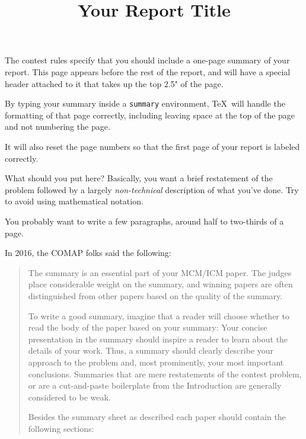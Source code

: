 \documentclass{icmmcm}
\title{Your Report Title}
\begin{document}
\newcommand{\tabincell}[2]{\begin{tabular}{@{}#1@{}}#2\end{tabular}}

\begin{summary}
  The contest rules specify that you should include a one-page summary
  of your report.  This page appears before the rest of the report,
  and will have a special header attached to it that takes up the top
  2.5" of the page.

  By typing your summary inside a \texttt{summary} environment, \TeX\ will
  handle the formatting of that page correctly, including leaving
  space at the top of the page and not numbering the page.
  
  It will also reset the page numbers so that the first page of your
  report is labeled correctly.
  
  What should you put here?  Basically, you want a brief restatement
  of the problem followed by a largely \emph{non-technical}
  description of what you've done.  Try to avoid using mathematical
  notation.
  
  You probably want to write a few paragraphs, around half to
  two-thirds of a page.

  In 2016, the COMAP folks said the following:
  \begin{quotation}
    The summary is an essential part of your MCM/ICM paper. The
    judges place considerable weight on the summary, and winning
    papers are often distinguished from other papers based on the
    quality of the summary.

    To write a good summary, imagine that a reader will choose
    whether to read the body of the paper based on your summary:
    Your concise presentation in the summary should inspire a
    reader to learn about the details of your work. Thus, a
    summary should clearly describe your approach to the problem
    and, most prominently, your most important conclusions.
    Summaries that are mere restatements of the contest problem,
    or are a cut-and-paste boilerplate from the Introduction are
    generally considered to be weak.

    Besides the summary sheet as described each paper should
    contain the following sections:


\end{quotation}
\end{summary}
\end{document}

